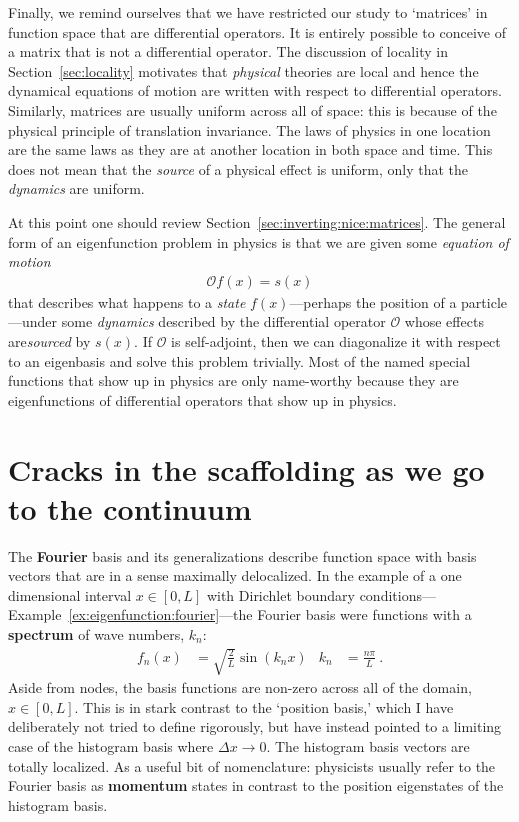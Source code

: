 Finally, we remind ourselves that we have restricted our study to `matrices' in function space that are differential operators. It is entirely possible to conceive of a matrix that is not a differential operator. The discussion of locality in Section~\ref{sec:locality} motivates that \emph{physical} theories are local and hence the dynamical equations of motion are written with respect to differential operators. Similarly, matrices are usually uniform across all of space: this is because of the physical principle of translation invariance. The laws of physics in one location are the same laws as they are at another location in both space and time. This does not mean that the \emph{source} of a physical effect is uniform, only that the \emph{dynamics} are uniform. 

At this point one should review Section~\ref{sec:inverting:nice:matrices}. The general form of an eigenfunction problem in physics is that we are given some \emph{equation of motion}
\begin{align}
    \mathcal O f(x) = s(x) 
\end{align}
that describes what happens to a \emph{state} $f(x)$---perhaps the position of a particle---under some \emph{dynamics} described by the differential operator $\mathcal O$ whose effects are\emph{sourced} by $s(x)$. If $\mathcal O$ is self-adjoint, then we can diagonalize it with respect to an eigenbasis and solve this problem trivially. Most of the named special functions that show up in physics are only name-worthy because they are eigenfunctions of differential operators that show up in physics.





\section{Cracks in the scaffolding as we go to the continuum}

The \textbf{Fourier} basis and its generalizations describe function space with basis vectors that are in a sense maximally delocalized. In the example of a one dimensional interval $x\in[0,L]$ with Dirichlet boundary conditions---Example~\ref{ex:eigenfunction:fourier}---the Fourier basis were functions with a \textbf{spectrum} of wave numbers, $k_n$:
\begin{align}
    f_n(x) &= \sqrt{\frac{2}{L}} \sin(k_nx)
    &
    k_n &= \frac{n\pi}{L} \ .
    \label{eq:example:of:fourier:basis}
\end{align}
Aside from nodes, the basis functions are non-zero across all of the domain, $x\in [0,L]$. This is in stark contrast to the `position basis,' which I have deliberately not tried to define rigorously, but have instead pointed to a limiting case of the histogram basis where $\Delta x \to 0$. The histogram basis vectors are totally localized. As a useful bit of nomenclature: physicists usually refer to the Fourier basis as \textbf{momentum} states in contrast to the position eigenstates of the histogram basis. 


